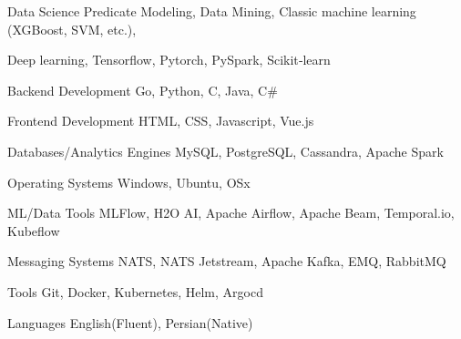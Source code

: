 

\begin{cvskills}

  \cvskill
    {Data Science} %
    {
      Predicate Modeling, Data Mining,
      Classic machine learning (XGBoost, SVM, etc.),
    } %

  \cvskill
    {} %
    {
      Deep learning, Tensorflow, Pytorch, PySpark, Scikit‐learn
    }

  \cvskill
    {Backend Development} %
    {Go, Python, C, Java, C\#} %

  \cvskill
    {Frontend Development} %
    {HTML, CSS, Javascript, Vue.js} %

  \cvskill
    {Databases/Analytics Engines} %
    {MySQL, PostgreSQL, Cassandra, Apache Spark} %

  \cvskill
    {Operating Systems} %
    {Windows, Ubuntu, OSx} %

  \cvskill
    {ML/Data Tools} %
    {MLFlow, H2O AI, Apache Airflow, Apache Beam, Temporal.io, Kubeflow} %

  \cvskill
    {Messaging Systems} %
    {NATS, NATS Jetstream, Apache Kafka, EMQ, RabbitMQ} %

  \cvskill
    {Tools} %
    {Git, Docker, Kubernetes, Helm, Argocd} %

  \cvskill
    {Languages} %
    {English(Fluent), Persian(Native)} %

\end{cvskills}

